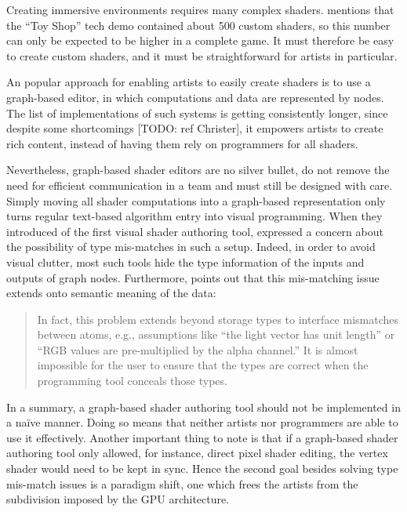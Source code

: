 Creating immersive environments requires many complex shaders. \citet{Tatarchuk06ToyShop} mentions that the ``Toy Shop'' tech demo contained about 500 custom shaders, so this number can only be expected to be higher in a complete game. It must therefore be easy to create custom shaders, and it must be straightforward for artists in particular.

An popular approach for enabling artists to easily create shaders is to use a graph-based editor, in which computations and data are represented by nodes. The list of implementations of such systems is getting consistently longer, since despite some shortcomings [TODO: ref Christer], it empowers artists to create rich content, instead of having them rely on programmers for all shaders.

Nevertheless, graph-based shader editors are no silver bullet, do not remove the need for efficient communication in a team and must still be designed with care. Simply moving all shader computations into a graph-based representation only turns regular text-based algorithm entry into visual programming. When they introduced of the first visual shader authoring tool, \citet{AbramWhitted90} expressed a concern about the possibility of type mis-matches in such a setup. Indeed, in order to avoid visual clutter, most such tools hide the type information of the inputs and outputs of graph nodes. Furthermore, \citet{mcguire2006shadetrees} points out that this mis-matching issue extends onto semantic meaning of the data:
	
\begin{quote}	
In fact, this problem extends beyond storage types to interface mismatches between atoms, e.g., assumptions like “the light vector has unit length” or “RGB values are pre-multiplied by the alpha channel.” It is almost impossible for the user to ensure that the types are correct when the programming tool conceals those types. 
\end{quote}

In a summary, a graph-based shader authoring tool should not be implemented in a naïve manner. Doing so means that neither artists nor programmers are able to use it effectively. Another important thing to note is that if a graph-based shader authoring tool only allowed, for instance, direct pixel shader editing, the vertex shader would need to be kept in sync. Hence the second goal besides solving type mis-match issues is a paradigm shift, one which frees the artists from the subdivision imposed by the GPU architecture.

